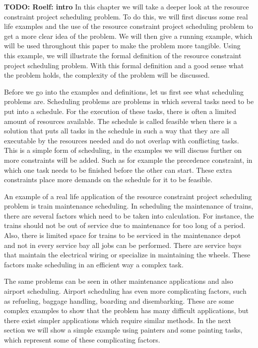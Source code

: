 \documentclass{article}
\theoremstyle{definition}
\newcommand{\TODO}[1]{{\color{red}\textbf{TODO: #1}}}
\begin{document}
\TODO{Roelf: intro}
In this chapter we will take a deeper look at the resource constraint project scheduling problem.
To do this, we will first discuss some real life examples and the use of the resource constraint project scheduling problem to get a more clear idea of the problem.
We will then give a running example, which will be used throughout this paper to make the problem more tangible.
Using this example, we will illustrate the formal definition of the resource constraint project scheduling problem.
With this formal definition and a good sense what the problem holds, the complexity of the problem will be discussed.

Before we go into the examples and definitions, let us first see what scheduling problems are.
Scheduling problems are problems in which several tasks need to be put into a schedule.
For the execution of these tasks, there is often a limited amount of resources available.
The schedule is called feasible when there is a solution that puts all tasks in the schedule in such a way that they are all executable by the resources needed and do not overlap with conflicting tasks.
This is a simple form of scheduling, in the examples we will discuss further on more constraints will be added.
Such as for example the precedence constraint, in which one task needs to be finished before the other can start.
These extra constraints place more demands on the schedule for it to be feasible.

An example of a real life application of the resource constraint project scheduling problem is train maintenance scheduling.
In scheduling the maintenance of trains, there are several factors which need to be taken into calculation.
For instance, the trains should not be out of service due to maintenance for too long of a period.
Also, there is limited space for trains to be serviced in the maintenance depot and not in every service bay all jobs can be performed.
There are service bays that maintain the electrical wiring or specialize in maintaining the wheels.
These factors make scheduling in an efficient way a complex task.

The same problems can be seen in other maintenance applications and also airport scheduling.
Airport scheduling has even more complicating factors, such as refueling, baggage handling, boarding and disembarking.
These are some complex examples to show that the problem has many difficult applications, but there exist simpler applications which require similar methods.
In the next section we will show a simple example using painters and some painting tasks, which represent some of these complicating factors.
\end{document}
